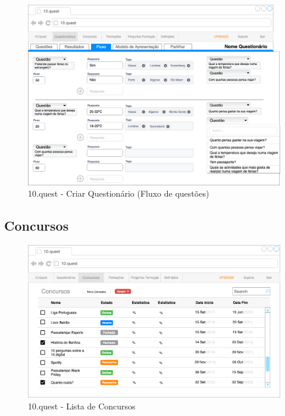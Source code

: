 \begin{figure}[ht!]
	\begin{center}
		\includegraphics[width=1\textwidth]{img/prototipos/17.png}
		\caption{10.quest - Criar Questionário (Fluxo de questões)}
		\label{10q-}
	\end{center}
\end{figure}

\newpage

\subsection{Concursos}

\begin{figure}[ht!]
	\begin{center}
		\includegraphics[width=1\textwidth]{img/prototipos/5.png}
		\caption{10.quest - Lista de Concursos}
		\label{10q-}
	\end{center}
\end{figure}

